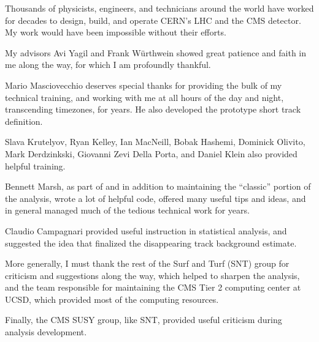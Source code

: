\begin{frontmatter}
%
%
\begin{acknowledgements}
Thousands of physicists, engineers, and technicians around the world have worked for decades to design, build, and operate CERN's LHC and the CMS detector.
My work would have been impossible without their efforts.

My advisors Avi Yagil and Frank W\"urthwein showed great patience and faith in me along the way, for which I am profoundly thankful.

Mario Masciovecchio deserves special thanks for providing the bulk of my technical training, and working with me at all hours of the day and night, transcending timezones, for years. 
He also developed the prototype short track definition.

Slava Krutelyov, Ryan Kelley, Ian MacNeill, Bobak Hashemi, Dominick Olivito, Mark Derdzinkski, Giovanni Zevi Della Porta, and Daniel Klein also provided helpful training.

Bennett Marsh, as part of and in addition to maintaining the ``classic'' portion of the analysis, wrote a lot of helpful code, offered many useful tips and ideas, and in general managed much of the tedious technical work for years.

Claudio Campagnari provided useful instruction in statistical analysis, and suggested the idea that finalized the disappearing track background estimate.

More generally, I must thank the rest of the Surf and Turf (SNT) group for criticism and suggestions along the way, which helped to sharpen the analysis, and the team responsible for maintaining the CMS Tier 2 computing center at UCSD, which provided most of the computing resources.

Finally, the CMS SUSY group, like SNT, provided useful criticism during analysis development.

\end{acknowledgements}



\end{frontmatter}
